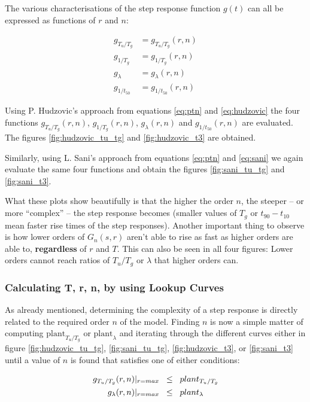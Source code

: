\clearpage

The various characterisations of the step response  function  $g(t)$  can all be
expressed as functions of $r$ and $n$:

\begin{align}
    g_{T_u/T_g}  &= g_{T_u/T_g}(r, n) \\
    g_{1/T_g}    &= g_{1/T_g}(r,n) \\
    g_{\lambda}  &= g_{\lambda}(r,n) \\
    g_{1/t_{50}} &= g_{1/t_{50}}(r,n)
\end{align}

Using P.  Hudzovic's  approach from equations \ref{eq:ptn} and \ref{eq:hudzovic}
the four functions $g_{T_u/T_g}(r, n)$, $g_{1/T_g}(r,n)$, $g_{\lambda}(r,n)$ and
$g_{1/t_{50}}(r,n)$  are  evaluated.  The figures  \ref{fig:hudzovic_tu_tg}  and
\ref{fig:hudzovic_t3} are obtained.

Similarly,  using   L.   Sani's   approach   from   equations  \ref{eq:ptn}  and
\ref{eq:sani} we  again  evaluate the same four functions and obtain the figures
\ref{fig:sani_tu_tg} and \ref{fig:sani_t3}.

What these plots show beautifully is that the  higher the order $n$, the steeper
-- or more ``complex'' -- the step response becomes (smaller  values of $T_g$ or
$t_{90}-t_{10}$ mean faster rise times of the step responses). Another important
thing  to observe is how lower orders of $G_n(s,r)$ aren't able to rise as  fast
as higher orders are able to, \textbf{regardless} of $r$ and $T$.  This can also
be seen in all four figures: Lower orders  cannot  reach  ratios of $T_u/T_g$ or
$\lambda$ that higher orders can.


\subsubsection*{Calculating T, r, n, by using Lookup Curves}

As already mentioned, determining the  complexity of a step response is directly
related  to  the  required  order $n$ of the model. Finding $n$ is now a  simple
matter of computing $\textrm{plant}_{T_u/T_g}$ or $\textrm{plant}_{\lambda}$ and
iterating     through    the    different    curves     either     in     figure
\ref{fig:hudzovic_tu_tg},   \ref{fig:sani_tu_tg},    \ref{fig:hudzovic_t3},   or
\ref{fig:sani_t3}  until  a value of $n$ is found that satisfies one  of  either
conditions:

\begin{align}
    g_{T_u/T_g}(r, n)\lvert_{r=max} \hspace{2mm} &\le \hspace{2mm} plant_{T_u/T_g} \\
    g_{\lambda}(r, n)\lvert_{r=max} \hspace{2mm} &\le \hspace{2mm} plant_{\lambda} \label{eq:find_n}
\end{align}

